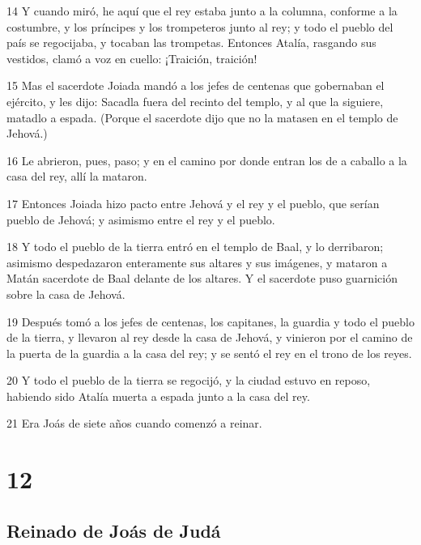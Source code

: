 \par 14 Y cuando miró, he aquí que el rey estaba junto a la columna, conforme a la costumbre, y los príncipes y los trompeteros junto al rey; y todo el pueblo del país se regocijaba, y tocaban las trompetas. Entonces Atalía, rasgando sus vestidos, clamó a voz en cuello: ¡Traición, traición!
\par 15 Mas el sacerdote Joiada mandó a los jefes de centenas que gobernaban el ejército, y les dijo: Sacadla fuera del recinto del templo, y al que la siguiere, matadlo a espada. (Porque el sacerdote dijo que no la matasen en el templo de Jehová.)
\par 16 Le abrieron, pues, paso; y en el camino por donde entran los de a caballo a la casa del rey, allí la mataron.
\par 17 Entonces Joiada hizo pacto entre Jehová y el rey y el pueblo, que serían pueblo de Jehová; y asimismo entre el rey y el pueblo.
\par 18 Y todo el pueblo de la tierra entró en el templo de Baal, y lo derribaron; asimismo despedazaron enteramente sus altares y sus imágenes, y mataron a Matán sacerdote de Baal delante de los altares. Y el sacerdote puso guarnición sobre la casa de Jehová.
\par 19 Después tomó a los jefes de centenas, los capitanes, la guardia y todo el pueblo de la tierra, y llevaron al rey desde la casa de Jehová, y vinieron por el camino de la puerta de la guardia a la casa del rey; y se sentó el rey en el trono de los reyes.
\par 20 Y todo el pueblo de la tierra se regocijó, y la ciudad estuvo en reposo, habiendo sido Atalía muerta a espada junto a la casa del rey.
\par 21 Era Joás de siete años cuando comenzó a reinar.

\chapter{12}

\section*{Reinado de Joás de Judá}

